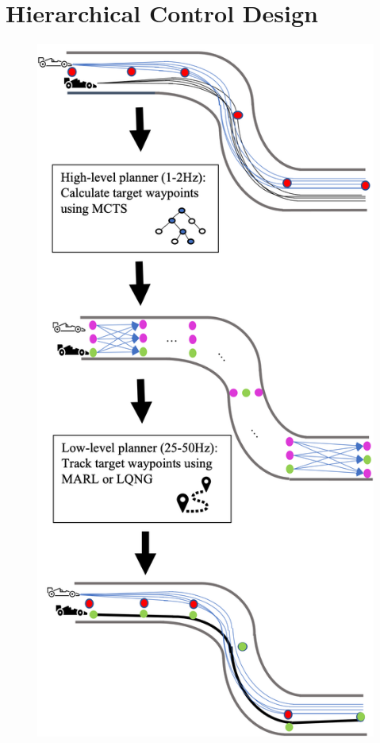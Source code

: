 \section{Hierarchical Control Design}
\begin{figure}
  \centering
    \includegraphics[height=0.8\textheight]{Figures/FormulationBreakdownVert.png}

\end{figure}
